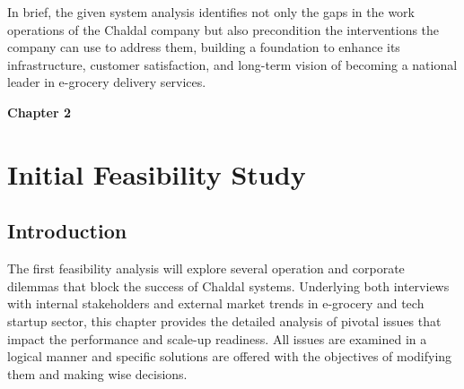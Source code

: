 \documentclass[12pt,a4paper]{article}
\begin{document}
In brief, the given system analysis identifies not only the gaps in the work operations of the Chaldal company but also precondition the interventions the company can use to address them, building a foundation to enhance its infrastructure, customer satisfaction, and long-term vision of becoming a national leader in e-grocery delivery services.



\clearpage

{\Large\bfseries\color{RoyalBlue}Chapter 2}
\vspace{0.8em}
\section{Initial Feasibility Study}
\vspace{0.6em}
\subsection{Introduction}

The first feasibility analysis will explore several operation and corporate dilemmas that block the success of Chaldal systems. Underlying both interviews with internal stakeholders and external market trends in e-grocery and tech startup sector, this chapter provides the detailed analysis of pivotal issues that impact the performance and scale-up readiness. All issues are examined in a logical manner and specific solutions are offered with the objectives of modifying them and making wise decisions.
\end{document}
